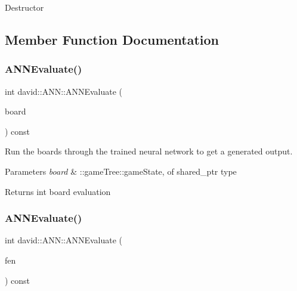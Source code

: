 Destructor 

\subsection{Member Function Documentation}
\mbox{\label{classdavid_1_1ANN_a896974d5b624e63b67cff602fa4b75ee}} 
\subsubsection{\texorpdfstring{A\+N\+N\+Evaluate()}{ANNEvaluate()}\hspace{0.1cm}{\footnotesize\ttfamily [1/2]}}
{\footnotesize\ttfamily int david\+::\+A\+N\+N\+::\+A\+N\+N\+Evaluate (\begin{DoxyParamCaption}\item[{\hyperlink{structdavid_1_1bitboard_1_1gameState}{type\+::game\+State\+\_\+t} \&}]{board }\end{DoxyParamCaption}) const}

Run the boards through the trained neural network to get a generated output.


\begin{DoxyParams}{Parameters}
{\em board} & \+::game\+Tree\+::game\+State, of shared\+\_\+ptr type \\
\hline
\end{DoxyParams}
\begin{DoxyReturn}{Returns}
int board evaluation 
\end{DoxyReturn}
\mbox{\label{classdavid_1_1ANN_a1c35d108904a12b8994b98d92fd7ffc4}} 
\subsubsection{\texorpdfstring{A\+N\+N\+Evaluate()}{ANNEvaluate()}\hspace{0.1cm}{\footnotesize\ttfamily [2/2]}}
{\footnotesize\ttfamily int david\+::\+A\+N\+N\+::\+A\+N\+N\+Evaluate (\begin{DoxyParamCaption}\item[{const std\+::string \&}]{fen }\end{DoxyParamCaption}) const}

